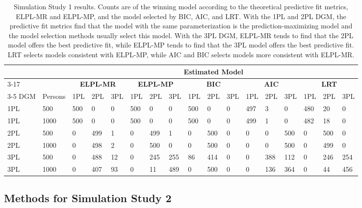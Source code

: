 \documentclass[
  english,
  man,floatsintext]{apa7}
\begin{document}
\setlength{\tabcolsep}{2pt}
\begin{table}
\caption{Simulation Study 1 results. Counts are of the winning model according to the theoretical predictive fit metrics, ELPL-MR and ELPL-MP, and the model selected by BIC, AIC, and LRT. With the 1PL and 2PL DGM, the predictive fit metrics find that the model with the same parameterization is the prediction-maximizing model and the model selection methods usually select this model. With the 3PL DGM, ELPL-MR tends to find that the 2PL model offers the best predictive fit, while ELPL-MP tends to find that the 3PL model offers the best predictive fit. LRT selects models consistent with ELPL-MP, while AIC and BIC selects models more consistent with ELPL-MR.}
\centering
\begin{small}
\begin{tabular}{@{\extracolsep{2pt}}lllllllllllllllll}
\hline
&&\multicolumn{15}{c}{\textbf{Estimated Model}} \\ \cmidrule{3-17}
\multirow{2}{*}{} &
    &
    \multicolumn{3}{c}{\textbf{ELPL-MR}} & 
    \multicolumn{3}{c}{\textbf{ELPL-MP}} &
    \multicolumn{3}{c}{\textbf{BIC}} &
    \multicolumn{3}{c}{\textbf{AIC}} &
    \multicolumn{3}{c}{\textbf{LRT}} \\ 
    \cmidrule{3-5} \cmidrule{6-8} \cmidrule{9-11} \cmidrule{12-14} \cmidrule{15-17}
DGM & Persons & 1PL & 2PL & 3PL & 1PL & 2PL & 3PL & 1PL & 2PL & 3PL & 1PL & 2PL & 3PL & 1PL & 2PL & 3PL  \\
\hline
1PL & 500 & 500 & 0 & 0 & 500 & 0 & 0 & 500 & 0 & 0 & 497 & 3 & 0 & 480 & 20 & 0   \\
1PL & 1000 & 500 & 0 & 0 & 500 & 0 & 0 & 500 & 0 & 0 & 499 & 1 & 0 & 482 & 18 & 0 \\
2PL & 500 & 0 & 499 & 1 & 0 & 499 & 1 & 0 & 500 & 0 & 0 & 0 & 500 & 0 & 500 & 0\\
2PL & 1000 & 0 & 498 & 2 & 0 & 500 & 0 & 0 & 500 & 0 & 0 & 0 & 500 & 0 & 499 & 0 \\
3PL & 500 & 0 & 488 & 12 & 0 & 245 & 255 & 86 & 414 & 0 & 0 & 388 & 112 & 0 & 246 & 254\\
3PL & 1000 & 0 & 407 & 93 & 0 & 11 & 489 & 0 & 500 & 0 & 0 & 136 & 364 & 0 & 44 & 456\\
\hline
\end{tabular}
\end{small}
\label{tab:results1}
\end{table}

\hypertarget{methods-for-simulation-study-2}{%
\subsection{Methods for Simulation Study 2}\label{methods-for-simulation-study-2}}
\end{document}
